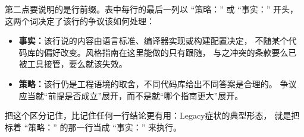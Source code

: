 \documentclass[12pt,a4paper,fontset=fandol]{ctexbook}
\newcommand{\Lang}[1]{\textsf{#1}}
\newcommand{\DomTra}{\Lang{Legacy}}
\begin{document}
第二点要说明的是行前缀。表中每行的最后一列以 ``策略：'' 或 ``事实：'' 开头，
这两个词决定了该行的争议该如何处理：

\begin{itemize}
  \item \textbf{事实：}该行说的内容由语言标准、编译器实现或构建配置决定，
        不随某个代码库的偏好改变。风格指南在这里能做的只有跟随，
        与之冲突的条款要么已被工具接管，要么就该失效。
  \item \textbf{策略：}该行仍是工程语境的取舍，不同代码库给出不同答案是合理的。
        争议应当就``前提是否成立''展开，而不是就``哪个指南更大''展开。
\end{itemize}

把这个区分记住，比记住任何一行结论更有用：\DomTra 症状的典型形态，
就是把标着 ``策略：'' 的那一行当成 ``事实：'' 来执行。
\end{document}
